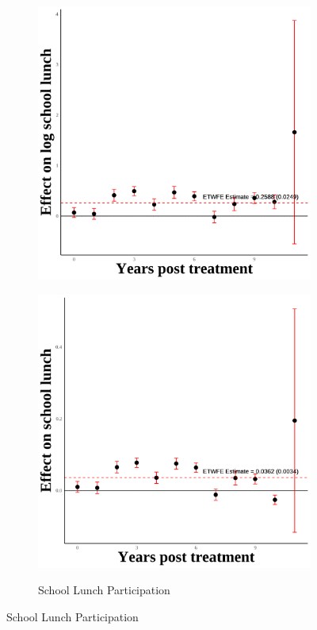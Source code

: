 \documentclass[12pt,english]{article}
\begin{document}
\begin{figure}[H]
\begin{subfigure}[b]{0.3\textwidth}
    \includegraphics[width=\linewidth]{figures/plot10-ln_schl_lunch_event_study-first.png}
    \label{fig:ln-schl-lunch-first}
  \end{subfigure}
  \hfill
  \begin{subfigure}[b]{0.3\textwidth}
    \centering
    \caption{School Lunch Participation}
    \includegraphics[width=\linewidth]{figures/plot11-schl_lunch_event_study-first.png}
    \label{fig:schl-lunch-first}
  \end{subfigure}


\end{figure}
\end{document}
